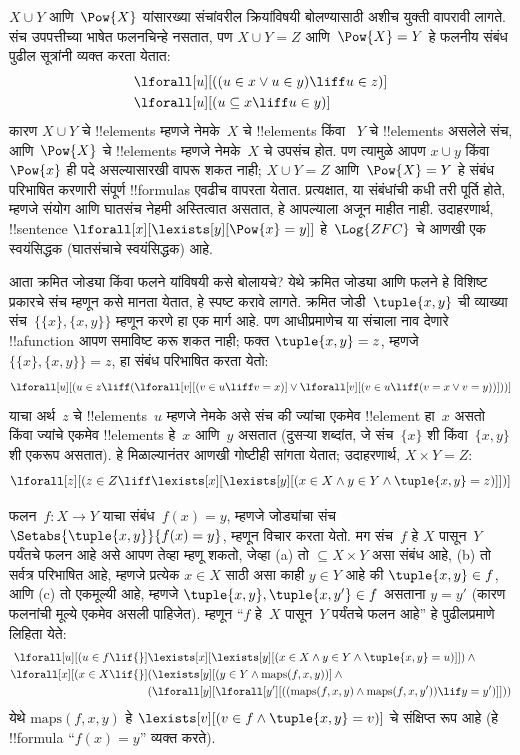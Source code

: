\documentclass[../../../include/open-logic-section]{subfiles}
\begin{document}
$X \cup Y$ आणि~$\Pow{X}$ यांसारख्या संचांवरील क्रियांविषयी बोलण्यासाठी
अशीच युक्ती वापरावी लागते. संच उपपत्तीच्या भाषेत फलनचिन्हे नसतात, पण
$X \cup Y = Z$ आणि~$\Pow{X} = Y$ हे फलनीय संबंध पुढील सूत्रांनी व्यक्त
करता येतात:
\begin{align*}
& \lforall[u][((u \in x \lor u \in y) \liff u \in z)]\\
& \lforall[u][(u \subseteq x \liff u \in y )]
\end{align*}
कारण $X \cup Y$ चे !!{element}s म्हणजे नेमके~$X$ चे !!{element}s किंवा
~$Y$ चे !!{element}s असलेले संच, आणि~$\Pow{X}$ चे !!{element}s म्हणजे नेमके~$X$
चे उपसंच होत. पण त्यामुळे आपण $x \cup y$ किंवा~$\Pow{x}$ ही पदे असल्यासारखी
वापरू शकत नाही; $X \cup Y = Z$ आणि~$\Pow{X} = Y$ हे संबंध परिभाषित करणारी
संपूर्ण !!{formula}s एवढीच वापरता येतात. प्रत्यक्षात, या संबंधांची कधी तरी
पूर्ति होते, म्हणजे संयोग आणि घातसंच नेहमी अस्तित्वात असतात, हे आपल्याला
अजून माहीत नाही. उदाहरणार्थ, !!{sentence}
$\lforall[x][\lexists[y][\Pow{x} = y]]$ हे~$\Log{ZFC}$ चे आणखी एक
स्वयंसिद्धक (घातसंचाचे स्वयंसिद्धक) आहे.

आता क्रमित जोड्या किंवा फलने यांविषयी कसे बोलायचे? येथे क्रमित जोड्या आणि
फलने हे विशिष्ट प्रकारचे संच म्हणून कसे मानता येतात, हे स्पष्ट करावे लागते.
क्रमित जोडी~$\tuple{x, y}$ ची व्याख्या संच~$\{\{x\}, \{x, y\}\}$ म्हणून
करणे हा एक मार्ग आहे. पण आधीप्रमाणेच या संचाला नाव देणारे !!a{function}
आपण समाविष्ट करू शकत नाही; फक्त $\tuple{x, y} = z$, म्हणजे
$\{\{x\}, \{x, y\}\} = z$, हा संबंध परिभाषित करता येतो:
\[
\lforall[u][(u \in z \liff (\lforall[v][(v \in u \liff v = x)] \lor
  \lforall[v][(v \in u \liff (v = x \lor v = y))]))]
\]
याचा अर्थ~$z$ चे !!{element}s~$u$ म्हणजे नेमके असे संच की ज्यांचा एकमेव
!!{element} हा~$x$ असतो किंवा ज्यांचे एकमेव !!{element}s हे~$x$ आणि~$y$
असतात (दुसऱ्या शब्दांत, जे संच~$\{x\}$ शी किंवा~$\{x, y\}$ शी एकरूप
असतात). हे मिळाल्यानंतर आणखी गोष्टीही सांगता येतात; उदाहरणार्थ,
$X \times Y = Z$:
\[
\lforall[z][(z \in Z \liff \lexists[x][\lexists[y][(x \in
        X \land y \in Y \land \tuple{x, y} = z)]])]
\]

फलन~$f \colon X \to Y$ याचा संबंध~$f(x) = y$, म्हणजे जोड्यांचा संच
$\Setabs{\tuple{x,y}}{f(x) = y}$, म्हणून विचार करता येतो. मग संच~$f$ हे
$X$ पासून~$Y$ पर्यंतचे फलन आहे असे आपण तेव्हा म्हणू शकतो, जेव्हा (a) तो
$\subseteq X \times Y$ असा संबंध आहे, (b) तो सर्वत्र परिभाषित आहे,
म्हणजे प्रत्येक $x \in X$ साठी असा काही $y \in Y$ आहे की
$\tuple{x, y} \in f$, आणि (c) तो एकमूल्यी आहे, म्हणजे
$\tuple{x, y}, \tuple{x, y'} \in f$ असताना $y = y'$ (कारण फलनांची मूल्ये
एकमेव असली पाहिजेत). म्हणून ``$f$ हे~$X$ पासून~$Y$ पर्यंतचे फलन आहे'' हे
पुढीलप्रमाणे लिहिता येते:
\begin{align*}
 \lforall[u][(u \in f \lif {}] & \lexists[x][\lexists[y][(x \in X \land y \in
      Y \land \tuple{x, y} = u)]]) \land {}\\
 \lforall[x][(x \in X \lif {}] &
      (\lexists[y][(y \in Y \land \mathrm{maps}(f, x, y))] \land {}\\
& (\lforall[y][\lforall[y'][((\mathrm{maps}(f, x, y) \land
    \mathrm{maps}(f, x, y')) \lif y = y')]]))
\end{align*}
येथे $\mathrm{maps}(f, x, y)$ हे $\lexists[v][(v \in f \land
  \tuple{x, y} = v)]$ चे संक्षिप्त रूप आहे (हे !!{formula} ``$f(x) = y$''
व्यक्त करते).
\end{document}
